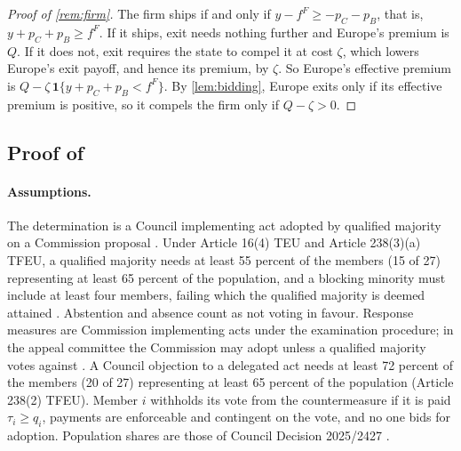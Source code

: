 \begin{proof}[Proof of \cref{rem:firm}]
The firm ships if and only if $y-f^F\ge -p_C-p_B$, that is, $y+p_C+p_B\ge f^F$. If it ships, exit needs nothing further and Europe's premium is $Q$. If it does not, exit requires the state to compel it at cost $\zeta$, which lowers Europe's exit payoff, and hence its premium, by $\zeta$. So Europe's effective premium is $Q-\zeta\,\mathbf 1\{y+p_C+p_B<f^F\}$. By \cref{lem:bidding}, Europe exits only if its effective premium is positive, so it compels the firm only if $Q-\zeta>0$.
\end{proof}

\subsection{Proof of \texorpdfstring{}{blocking minorities}}

\paragraph{Assumptions.} The determination is a Council implementing act adopted by qualified majority on a Commission proposal \citep{eu2023aci}. Under Article 16(4) TEU and Article 238(3)(a) TFEU, a qualified majority needs at least 55 percent of the members (15 of 27) representing at least 65 percent of the population, and a blocking minority must include at least four members, failing which the qualified majority is deemed attained \citep{eu2016tfeu}. Abstention and absence count as not voting in favour. Response measures are Commission implementing acts under the examination procedure; in the appeal committee the Commission may adopt unless a qualified majority votes against \citep{eu2011comitology}. A Council objection to a delegated act needs at least 72 percent of the members (20 of 27) representing at least 65 percent of the population (Article 238(2) TFEU). Member $i$ withholds its vote from the countermeasure if it is paid $\tau_i\ge q_i$, payments are enforceable and contingent on the vote, and no one bids for adoption. Population shares are those of Council Decision 2025/2427 \citep{council2025population}.

